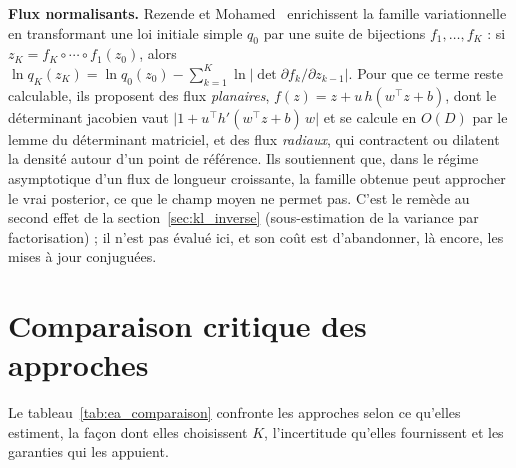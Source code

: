\textbf{Flux normalisants. }Rezende et Mohamed~\cite{rezende2015} enrichissent la famille variationnelle en transformant une loi initiale simple $q_0$ par une suite de bijections $f_1, \ldots, f_K$ : si $z_K = f_K \circ \cdots \circ f_1(z_0)$, alors $\ln q_K(z_K) = \ln q_0(z_0) - \sum_{k=1}^K \ln \lvert \det \partial f_k / \partial z_{k-1} \rvert$. Pour que ce terme reste calculable, ils proposent des flux \emph{planaires}, $f(z) = z + u\,h(w^\top z + b)$, dont le déterminant jacobien vaut $\lvert 1 + u^\top h'(w^\top z + b)\,w \rvert$ et se calcule en $O(D)$ par le lemme du déterminant matriciel, et des flux \emph{radiaux}, qui contractent ou dilatent la densité autour d'un point de référence. Ils soutiennent que, dans le régime asymptotique d'un flux de longueur croissante, la famille obtenue peut approcher le vrai posterior, ce que le champ moyen ne permet pas. C'est le remède au second effet de la section~\ref{sec:kl_inverse} (sous-estimation de la variance par factorisation) ; il n'est pas évalué ici, et son coût est d'abandonner, là encore, les mises à jour conjuguées.

\section{Comparaison critique des approches}\label{sec:ea_comparaison}
Le tableau~\ref{tab:ea_comparaison} confronte les approches selon ce qu'elles estiment, la façon dont elles choisissent $K$, l'incertitude qu'elles fournissent et les garanties qui les appuient.

